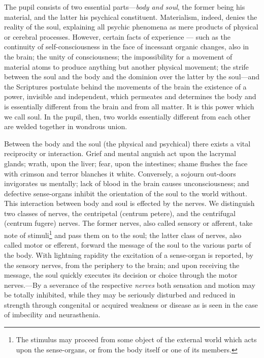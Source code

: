 The pupil consists of two essential parts—\emph{body and soul}, the former being his material, and the latter his psychical constituent. Materialism, indeed, denies the reality of the soul, explaining all psychic phenomena as mere products
of physical or cerebral processes. However, certain facts of experience — such as the continuity of self-consciousness in the face of incessant organic changes, also in the brain; the unity of consciousness; the impossibility for a movement of material atoms to produce anything but another physical movement; the strife between the soul and the body and the dominion over the latter by the soul—and the Scriptures postulate behind the movements of the brain the existence of a power, invisible and independent, which permeates and determines the body and is essentially different from the brain and from all matter. It is this power which we call soul. In the pupil, then, two worlds essentially different from each other are welded together in wondrous union.

Between the body and the soul (the physical and psychical) there exists a vital reciprocity or interaction. Grief and mental anguish act upon the lacrymal glands; wrath, upon the liver; fear, upon the intestines; shame flushes the face with crimson and terror blanches it white. Conversely, a sojourn out-doors invigorates us mentally; lack of blood in the brain causes unconsciousness; and defective sense-organs inhibit the orientation of the soul to the world without. This interaction between body and soul is effected by the nerves. We distinguish two classes of nerves, the centripetal (centrum petere), and the centrifugal (centrum fugere) nerves. The former nerves, also called sensory or afferent, take note of stimuli\footnote{The stimulus may proceed from some object of the external world which acts upon the sense-organs, or from the body itself or one of its members.} and pass them on to the soul; the latter class of nerves, also called motor or efferent, forward the message of the soul to the various parts of the body. With lightning rapidity the excitation of a sense-organ is reported, by the sensory nerves, from the periphery to the brain; and upon receiving the message, the soul quickly executes its decision or choice through the motor nerves.—By a severance
of the respective \emph{nerves} both sensation and motion may be totally inhibited, while they may be seriously disturbed and reduced in strength through congenital or acquired weakness or disease as is seen in the case of imbecility and neurasthenia.

